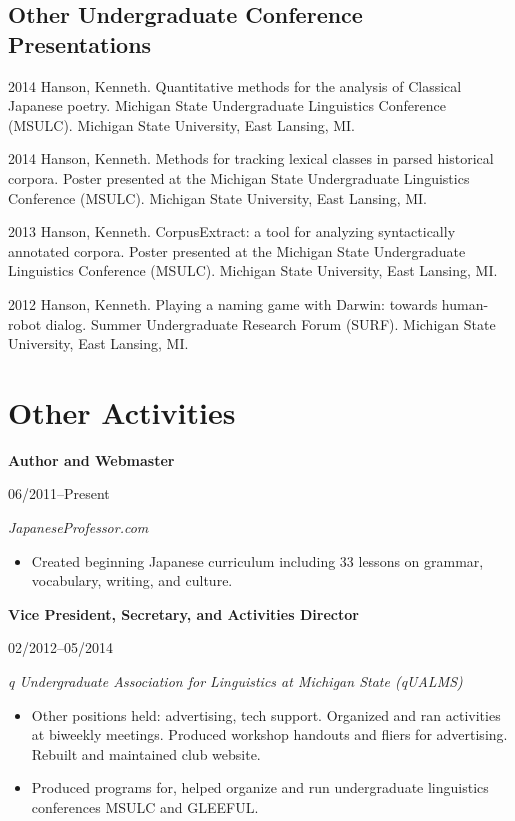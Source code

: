 \documentclass[10pt,oneside]{article}
\newcommand{\ressection}[1]{
	\vspace{-12pt}
	\section*{#1}
}
\newcommand{\ressubsection}[1]{
	\subsection*{#1}
	\vspace{-4pt}
}
\newcommand{\resbigitem}[4]{
	\item \parbox[t]{0.8\textwidth}{\textbf{#1}} \hfill #2 \\
		\parbox[t]{0.8\textwidth}{\textit{#3}} \hfill \textit{#4}
}
\begin{document}
\ressubsection{Other Undergraduate Conference Presentations}
\begin{publist}
	\item[2014] {Hanson, Kenneth. Quantitative methods for the analysis of Classical Japanese poetry. Michigan State Undergraduate Linguistics Conference (MSULC). Michigan State University, East Lansing, MI.}
	
	\item[2014] {Hanson, Kenneth. Methods for tracking lexical classes in parsed historical corpora. Poster presented at the Michigan State Undergraduate Linguistics Conference (MSULC). Michigan State University, East Lansing, MI.}
	
	\item[2013] {Hanson, Kenneth. CorpusExtract: a tool for analyzing syntactically annotated corpora. Poster presented at the Michigan State Undergraduate Linguistics Conference (MSULC). Michigan State University, East Lansing, MI.}
	
	\item[2012] {Hanson, Kenneth. Playing a naming game with Darwin: towards human-robot dialog. Summer Undergraduate Research Forum (SURF). Michigan State University, East Lansing, MI.}
\end{publist}


\ressection{Other Activities}

\begin{reslist}
	\resbigitem{Author and Webmaster}
		{06/2011--Present}
		{JapaneseProfessor.com}
		{}
	\begin{itemize}
		\item Created beginning Japanese curriculum including 33 lessons on grammar, vocabulary, writing, and culture.
	\end{itemize}
	
	\resbigitem{Vice President, Secretary, and Activities Director}
		{02/2012--05/2014}
		{q Undergraduate Association for Linguistics at Michigan State (qUALMS)}
		{}
	\begin{itemize}
		\item Other positions held: advertising, tech support. Organized and ran activities at biweekly meetings. Produced workshop handouts and fliers for advertising. Rebuilt and maintained club website.
		\item Produced programs for, helped organize and run undergraduate linguistics conferences MSULC and GLEEFUL. 
	\end{itemize}
\end{reslist}
\end{document}
